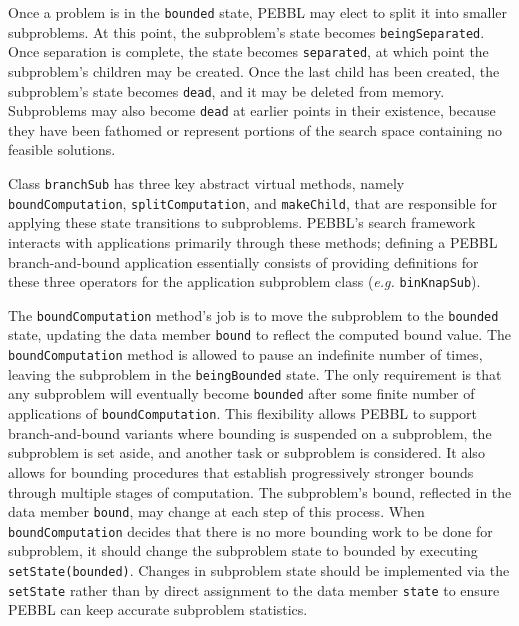 Once a problem is in the \texttt{bounded} state, PEBBL may elect to
split it into smaller subproblems.  At this point, the subproblem's
state becomes \texttt{beingSeparated}.  Once separation is complete,
the state becomes \texttt{separated}, at which point the subproblem's
children may be created.  Once the last child has been created, the
subproblem's state becomes \texttt{dead}, and it may be deleted from
memory.  Subproblems may also become \texttt{dead} at earlier points
in their existence, because they have been fathomed or represent
portions of the search space containing no feasible solutions.

Class \texttt{branchSub} has three key abstract virtual methods,
namely \texttt{boundComputation}, \texttt{splitComputation}, and
\texttt{makeChild}, that are responsible for applying these state
transitions to subproblems.  PEBBL's search framework interacts with
applications primarily through these methods; defining a PEBBL
branch-and-bound application essentially consists of providing
definitions for these three operators for the application subproblem
class ({\em e.g.} \texttt{binKnapSub}).

The \texttt{boundComputation} method's job is to move the subproblem
to the \texttt{bounded} state, updating the data member \texttt{bound}
to reflect the computed bound value.  The \texttt{boundComputation} method
is allowed to pause an indefinite number of times, leaving the
subproblem in the \texttt{beingBounded} state.  The only requirement
is that any subproblem will eventually become \texttt{bounded} after
some finite number of applications of \texttt{boundComputation}.  This
flexibility allows PEBBL to support branch-and-bound variants where 
bounding is suspended on a subproblem, the subproblem is set aside, and another
task or subproblem is considered.  It also allows for bounding
procedures that establish progressively stronger bounds through
multiple stages of computation.  The
subproblem's bound, reflected in the data member \texttt{bound}, may
change at each step of this process.  When \texttt{boundComputation}
decides that there is no more bounding work to be done for subproblem,
it should change the subproblem state to bounded by executing
\texttt{setState(bounded)}.  Changes in subproblem state should be
implemented via the \texttt{setState} rather than by direct assignment
to the data member \texttt{state} to ensure PEBBL can keep accurate
subproblem statistics.

